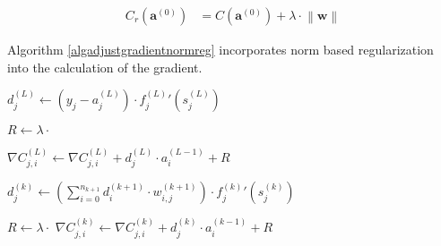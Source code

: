 \documentclass[titlepage]{article}
\begin{document}
          \begin{equation}
            \begin{split}
              C_r \left( \mathbf{a}^{(0)} \right)
                  & = C \left( \mathbf{a}^{(0)} \right)
                      +
                      \lambda \cdot \left\| \mathbf{w} \right\|
            \end{split}
          \end{equation}

          Algorithm \ref{algadjustgradientnormreg} incorporates norm based
          regularization into the calculation of the gradient.

          \begin{algorithm}
            \caption{%
              Modified version of algorithm \ref{algadjustgradient} with
              norm-based regularization.
            } \label{algadjustgradientnormreg}
            \begin{algorithmic}
                  \State $
                    d_j^{(L)} \gets
                      \left( y_j - a_j^{(L)} \right)
                      \cdot
                      {f_j^{(L)}}' \left( s_j^{(L)} \right)
                  $

                    \State $R \gets \lambda \cdot$ 

                    \State $
                      \nabla C_{j,i}^{(L)} \gets
                        \nabla C_{j,i}^{(L)} + d_j^{(L)} \cdot a_i^{(L-1)} + R
                    $
                  \EndFor
                \EndFor

                    \State $
                      d_j^{(k)} \gets
                        \left(
                          \sum_{i=0}^{n_{k+1}} d_i^{(k+1)} \cdot w_{i,j}^{(k+1)}
                        \right)
                        \cdot
                        {f_j^{(k)}}' \left( s_j^{(k)} \right)
                    $

                      \State $R \gets \lambda \cdot$ 
                      \State $
                        \nabla C_{j,i}^{(k)} \gets
                          \nabla C_{j,i}^{(k)} + d_j^{(k)} \cdot a_i^{(k-1)} + R
                      $
                    \EndFor
                  \EndFor
                \EndFor
              \EndProcedure
            \end{algorithmic}
          \end{algorithm}
\end{document}
